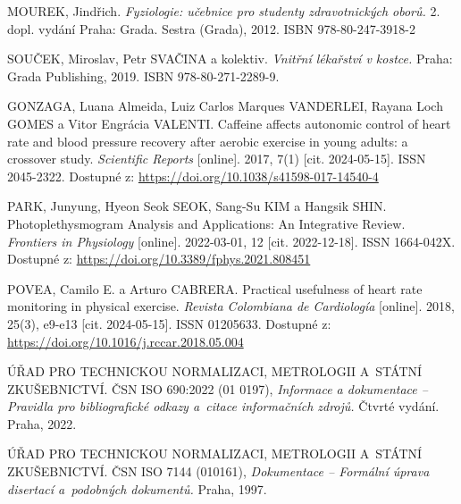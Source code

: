 \begin{thebibliography}{99}
		MOUREK, Jindřich.
		\emph{Fyziologie: učebnice pro studenty zdravotnických oborů.}
		2.\, dopl. vydání Praha: Grada. Sestra (Grada), 2012.
		ISBN 978-80-247-3918-2

		SOUČEK, Miroslav, Petr SVAČINA a kolektiv.
		\emph{Vnitřní lékařství v kostce.}
		Praha: Grada Publishing, 2019.
		ISBN 978-80-271-2289-9.

		GONZAGA, Luana Almeida, Luiz Carlos Marques VANDERLEI, Rayana Loch GOMES a Vitor Engrácia VALENTI.
		Caffeine affects autonomic control of heart rate and blood pressure recovery after aerobic exercise in young adults: a crossover study.
		\emph{Scientific Reports} [online].
		2017, 7(1) [cit. 2024-05-15].
		ISSN 2045-2322.
		Dostupné z: \url{https://doi.org/10.1038/s41598-017-14540-4}

		PARK, Junyung, Hyeon Seok SEOK, Sang-Su KIM a Hangsik SHIN.
		Photoplethysmogram Analysis and Applications: An Integrative Review.
		\emph{Frontiers in Physiology} [online].
		2022-03-01, 12 [cit. 2022-12-18].
		ISSN 1664-042X.
		Dostupné z: \url{https://doi.org/10.3389/fphys.2021.808451}

		POVEA, Camilo E. a Arturo CABRERA.
		Practical usefulness of heart rate monitoring in physical exercise.
		\emph{Revista Colombiana de Cardiología} [online].
		2018, 25(3), e9-e13 [cit. 2024-05-15].
		ISSN 01205633.
		Dostupné z: \url{https://doi.org/10.1016/j.rccar.2018.05.004}


		ÚŘAD PRO TECHNICKOU NORMALIZACI, METROLOGII A~STÁTNÍ ZKUŠEBNICTVÍ.
		ČSN ISO 690:2022 (01 0197), \emph{Informace a dokumentace -- Pravidla pro bibliografické odkazy a~citace informačních zdrojů.}
		Čtvrté vydání. Praha, 2022.

		ÚŘAD PRO TECHNICKOU NORMALIZACI, METROLOGII A~STÁTNÍ ZKUŠEBNICTVÍ.
		ČSN ISO 7144 (010161), \emph{Dokumentace -- Formální úprava disertací a~podobných dokumentů.}
		Praha, 1997.


\end{thebibliography}
